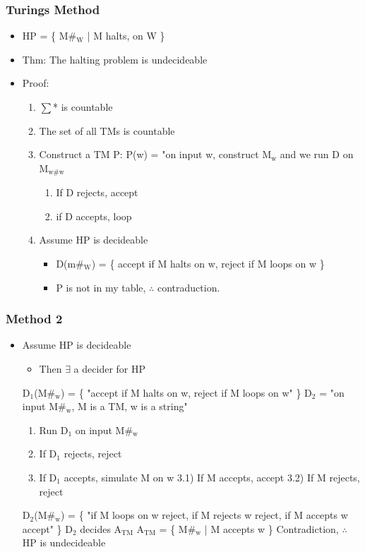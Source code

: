 \documentclass[11pt]{article}
\begin{document}
\subsubsection{Turings Method}
\label{sec:orge0fbaca}
\begin{itemize}
\item HP = \{ M\#\(_{\text{W}}\) | M halts, on W \}
\item Thm: The halting problem is undecideable
\item Proof: 
\begin{enumerate}
\item \(\sum\)* is countable
\item The set of all TMs is countable
\item Construct a TM P:
P(w) = "on input w, construct M\(_{\text{w}}\) and we run D on M\(_{\text{w\#w}}\)
\begin{enumerate}
\item If D rejects, accept
\item if D accepts, loop
\end{enumerate}
\item Assume HP is decideable
\begin{itemize}
\item D(m\#\(_{\text{W}}\)) = \{ accept if M halts on w, reject if M loops on w \}
\item P is not in my table, \(\therefore\) contraduction.
\end{itemize}
\end{enumerate}
\end{itemize}
\subsubsection{Method 2}
\label{sec:orgefb8c32}
\begin{itemize}
\item Assume HP is decideable
\begin{itemize}
\item Then \(\exists\) a decider for HP
\end{itemize}
D\(_{\text{1}}\)(M\#\(_{\text{w}}\)) = \{ "accept if M halts on w, reject if M loops on w" \}
D\(_{\text{2}}\) = "on input M\#\(_{\text{w}}\), M is a TM, w is a string"
\begin{enumerate}
\item Run D\(_{\text{1}}\) on input M\#\(_{\text{w}}\)
\item If D\(_{\text{1}}\) rejects, reject
\item If D\(_{\text{1}}\) accepts, simulate M on w
3.1) If M accepts, accept
3.2) If M rejects, reject
\end{enumerate}
D\(_{\text{2}}\)(M\#\(_{\text{w}}\)) = \{ "if M loops on w reject, if M rejects w reject, if M accepts w accept" \}
D\(_{\text{2}}\) decides A\(_{\text{TM}}\)
A\(_{\text{TM}}\) = \{ M\#\(_{\text{w}}\) | M accepts w \}
Contradiction, \(\therefore\) HP is undecideable
\end{itemize}
\end{document}
